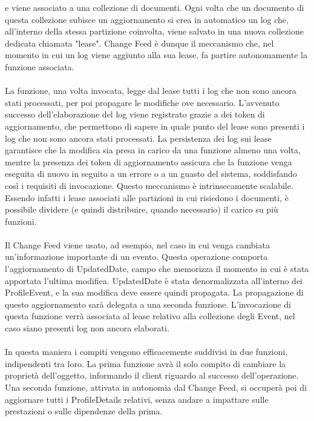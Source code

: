 e viene associato a una collezione di documenti.
Ogni volta che un documento di questa collezione subisce un aggiornamento
si crea in automatico un log che,
all'interno della stessa partizione coinvolta,
viene salvato in una nuova collezione dedicata chiamata "lease".
Change Feed è dunque il meccanismo che,
nel momento in cui un log viene aggiunto alla sua lease,
fa partire autonomamente la funzione associata.\\
\\
La funzione, una volta invocata,
legge dal lease tutti i log che non sono ancora stati processati,
per poi propagare le modifiche ove necessario.
L'avvenuto successo dell'elaborazione del log viene registrato
grazie a dei token di aggiornamento,
che permettono di sapere in quale punto del lease 
sono presenti i log che non sono ancora stati processati.
La persistenza dei log sui lease garantisce
che la modifica sia presa in carico da una funzione almeno una volta,
mentre la presenza dei token di aggiornamento assicura
che la funzione venga eseguita di nuovo in seguito a un errore o a un guasto del sistema,
soddisfando così i requisiti di invocazione.
Questo meccanismo è intrinsecamente scalabile.
Essendo infatti i lease associati alle partizioni in cui risiedono i documenti,
è possibile dividere (e quindi distribuire, quando necessario) il carico su più funzioni.\\
\\
Il Change Feed viene usato, ad esempio,
nel caso in cui venga cambiata un'informazione importante di un evento.
Questa operazione comporta l'aggiornamento di UpdatedDate,
campo che memorizza il momento in cui è stata apportata l'ultima modifica.
UpdatedDate è stata denormalizzata all'interno dei ProfileEvent,
e la sua modifica deve essere quindi propagata.
La propagazione di questo aggiornamento sarà delegata a una seconda funzione.
L'invocazione di questa funzione verrà associata
al lease relativo alla collezione degli Event,
nel caso siano presenti log non ancora elaborati.\\
\\
In questa maniera i compiti vengono efficacemente suddivisi in due funzioni,
indipendenti tra loro.
La prima funzione avrà il solo compito di cambiare la proprietà dell'oggetto,
informando il client riguardo al successo dell'operazione.
Una seconda funzione, attivata in autonomia dal Change Feed,
si occuperà poi di aggiornare tutti i ProfileDetails relativi,
senza andare a impattare sulle prestazioni o sulle dipendenze della prima.\\
